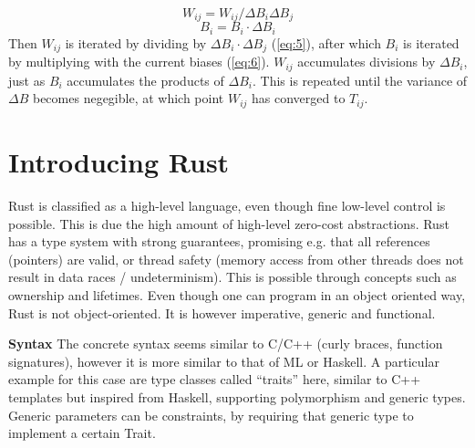 \newpage
\begin{equation}\label{eq:5}
    W_{ij} = W_{ij} / \Delta B_i \Delta B_j
\end{equation}
\begin{equation}\label{eq:6}
    B_i = B_i \cdot \Delta B_i
\end{equation}
Then $W_{ij}$ is iterated by dividing by $\Delta B_i \cdot \Delta B_j$
(\eqref{eq:5}), after which $B_i$ is iterated by multiplying with the current
biases (\eqref{eq:6}). $W_{ij}$ accumulates divisions by $\Delta B_i$, just as
$B_i$ accumulates the products of $\Delta B_i$. This is repeated until the
variance of $\Delta B$ becomes negegible, at which point $W_{ij}$ has converged
to $T_{ij}$.






\section{Introducing Rust}\label{sec:Rust}

Rust is classified as a high-level language, even though fine low-level control
is possible. This is due the high amount of high-level zero-cost abstractions.
Rust has a type system with strong guarantees, promising e.g. that all
references (pointers) are valid, or thread safety (memory access from other
threads does not result in data races / undeterminism). This is possible
through concepts such as ownership and lifetimes. Even though one can program
in an object oriented way, Rust is not object-oriented. It is however
imperative, generic and functional.

\textbf{Syntax}\label{sec:syntax}
The concrete syntax seems similar to C/C++ (curly braces, function signatures),
however it is more similar to that of ML or Haskell. A particular example for
this case are type classes called ``traits'' here, similar to C++ templates but
inspired from Haskell, supporting polymorphism and generic types. Generic
parameters can be constraints, by requiring that generic type to implement a
certain Trait. 

